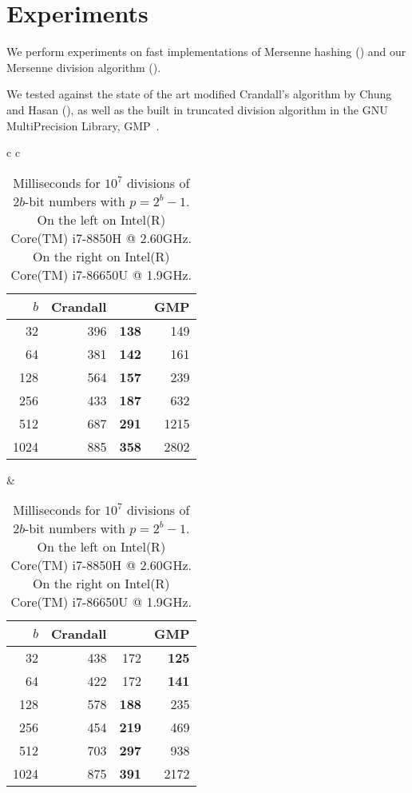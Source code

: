 \section{Experiments}
We perform experiments on fast implementations of Mersenne hashing () and our Mersenne division algorithm ().

\vspace{2em}

We tested  against the state of the art modified Crandall's algorithm by Chung and Hasan (), as well as the built in truncated division algorithm in the GNU MultiPrecision Library, GMP~\cite{granlund2010gnu}.

\begin{table}[H]
   \centering
   \begin{tabular}{ c c }
      \begin{tabular}{ r | r r r }
         $b$ & Crandall & \Cref{alg:division-generalized} & GMP \\
         \hline
         32 & 396 & \textbf   {138}  & 149\\
         64 & 381 &   \textbf {142}  & 161\\
         128 & 564 &  \textbf {157}  & 239\\
         256 & 433 &  \textbf {187}  & 632\\
         512 & 687 &  \textbf {291}  & 1215\\
         1024 & 885 & \textbf {358}  & 2802
      \end{tabular}
      \hspace{.5em}
      &
      \hspace{.5em}
      \begin{tabular}{ r | r r r }
         $b$ & Crandall & \Cref{alg:division-generalized} & GMP \\
         \hline
         32 & 438 & 172 & \textbf{125}\\
         64 & 422 & 172 & \textbf{141}\\
         128 & 578 &      \textbf{188} & 235\\
         256 & 454 &      \textbf{219} & 469\\
         512 & 703 &      \textbf{297} & 938\\
         1024 & 875 &     \textbf{391} & 2172\\

      \end{tabular}
   \end{tabular}
   \caption{Milliseconds for $10^7$ divisions of $2b$-bit numbers with $p=2^b-1$.
         On the left on Intel(R) Core(TM) i7-8850H @ 2.60GHz.
      On the right on Intel(R) Core(TM) i7-86650U @ 1.9GHz.
   }
   \label{tab:division-experiments}
\end{table}

